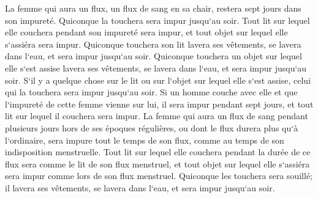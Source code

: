 \verse La femme qui aura un flux, un flux de sang en sa chair, restera sept jours dans son impureté. Quiconque la touchera sera impur jusqu`au soir. 
\verse Tout lit sur lequel elle couchera pendant son impureté sera impur, et tout objet sur lequel elle s`assiéra sera impur. 
\verse Quiconque touchera son lit lavera ses vêtements, se lavera dans l`eau, et sera impur jusqu`au soir. 
\verse Quiconque touchera un objet sur lequel elle s`est assise lavera ses vêtements, se lavera dans l`eau, et sera impur jusqu`au soir. 
\verse S`il y a quelque chose sur le lit ou sur l`objet sur lequel elle s`est assise, celui qui la touchera sera impur jusqu`au soir. 
\verse Si un homme couche avec elle et que l`impureté de cette femme vienne sur lui, il sera impur pendant sept jours, et tout lit sur lequel il couchera sera impur. 
\verse La femme qui aura un flux de sang pendant plusieurs jours hors de ses époques régulières, ou dont le flux durera plus qu`à l`ordinaire, sera impure tout le temps de son flux, comme au temps de son indisposition menstruelle. 
\verse Tout lit sur lequel elle couchera pendant la durée de ce flux sera comme le lit de son flux menstruel, et tout objet sur lequel elle s`assiéra sera impur comme lors de son flux menstruel. 
\verse Quiconque les touchera sera souillé; il lavera ses vêtements, se lavera dans l`eau, et sera impur jusqu`au soir. 
